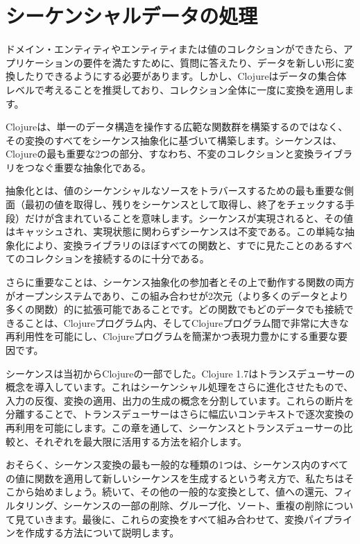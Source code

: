 \chapter{シーケンシャルデータの処理}

ドメイン・エンティティやエンティティまたは値のコレクションができたら、アプリケーションの要件を満たすために、質問に答えたり、データを新しい形に変換したりできるようにする必要があります。しかし、Clojureはデータの集合体レベルで考えることを推奨しており、コレクション全体に一度に変換を適用します。

Clojureは、単一のデータ構造を操作する広範な関数群を構築するのではなく、その変換のすべてをシーケンス抽象化に基づいて構築します。シーケンスは、Clojureの最も重要な2つの部分、すなわち、不変のコレクションと変換ライブラリをつなぐ重要な抽象化である。

抽象化とは、値のシーケンシャルなソースをトラバースするための最も重要な側面（最初の値を取得し、残りをシーケンスとして取得し、終了をチェックする手段）だけが含まれていることを意味します。シーケンスが実現されると、その値はキャッシュされ、実現状態に関わらずシーケンスは不変である。この単純な抽象化により、変換ライブラリのほぼすべての関数と、すでに見たことのあるすべてのコレクションを接続するのに十分である。

さらに重要なことは、シーケンス抽象化の参加者とその上で動作する関数の両方がオープンシステムであり、この組み合わせが2次元（より多くのデータとより多くの関数）的に拡張可能であることです。どの関数でもどのデータでも接続できることは、Clojureプログラム内、そしてClojureプログラム間で非常に大きな再利用性を可能にし、Clojureプログラムを簡潔かつ表現力豊かにする重要な要因です。

シーケンスは当初からClojureの一部でした。Clojure 1.7はトランスデューサーの概念を導入しています。これはシーケンシャル処理をさらに進化させたもので、入力の反復、変換の適用、出力の生成の概念を分割しています。これらの断片を分離することで、トランスデューサーはさらに幅広いコンテキストで逐次変換の再利用を可能にします。この章を通して、シーケンスとトランスデューサーの比較と、それぞれを最大限に活用する方法を紹介します。

おそらく、シーケンス変換の最も一般的な種類の1つは、シーケンス内のすべての値に関数を適用して新しいシーケンスを生成するという考え方で、私たちはそこから始めましょう。続いて、その他の一般的な変換として、値への還元、フィルタリング、シーケンスの一部の削除、グループ化、ソート、重複の削除について見ていきます。最後に、これらの変換をすべて組み合わせて、変換パイプラインを作成する方法について説明します。 

